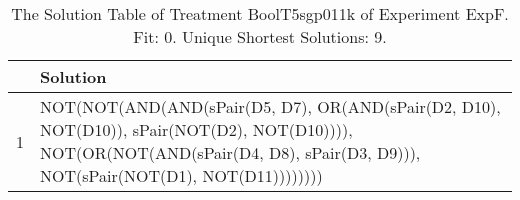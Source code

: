 \begin{table}[ht]
\centering
\begin{tabular}{rp{9cm}}
  \hline
 & Solution \\ 
  \hline
1 & NOT(NOT(AND(AND(sPair(D5, D7), OR(AND(sPair(D2, D10), NOT(D10)), sPair(NOT(D2), NOT(D10)))), NOT(OR(NOT(AND(sPair(D4, D8), sPair(D3, D9))), NOT(sPair(NOT(D1), NOT(D11)))))))) \\ 
   \hline
\end{tabular}
\caption{The Solution Table of Treatment BoolT5sgp011k of Experiment ExpF. Fit: 0. Unique Shortest Solutions: 9.} 
\end{table}
